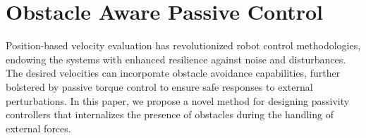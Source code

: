 % 
% 
% 
% 
% 
% 
% 
% 
% 
% 
% 
% 
% 
% 

 
\chapter{Obstacle Aware Passive Control}
% 
% 
Position-based velocity evaluation has revolutionized robot control methodologies, endowing the systems with enhanced resilience against noise and disturbances. The desired velocities can incorporate obstacle avoidance capabilities, further bolstered by passive torque control to ensure safe responses to external perturbations. 
In this paper, we propose a novel method for designing passivity controllers that internalizes the presence of obstacles during the handling of external forces.

